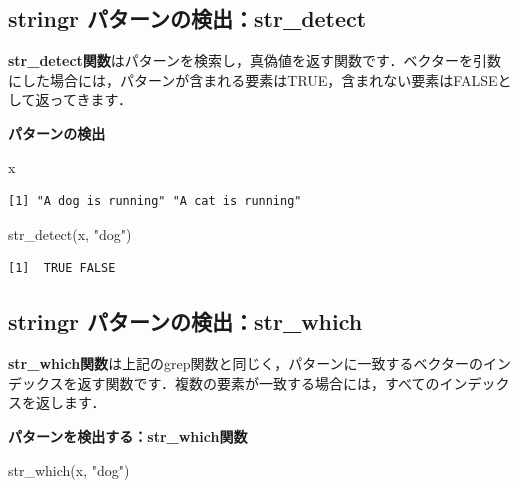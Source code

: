\documentclass[
  letterpaper,
  DIV=11,
  numbers=noendperiod]{scrreprt}
\newenvironment{Shaded}{\begin{snugshade}}{\end{snugshade}}
\newcommand{\FunctionTok}[1]{\textcolor[rgb]{0.28,0.35,0.67}{#1}}
\newcommand{\NormalTok}[1]{\textcolor[rgb]{0.00,0.23,0.31}{#1}}
\newcommand{\StringTok}[1]{\textcolor[rgb]{0.13,0.47,0.30}{#1}}
\begin{document}
\hypertarget{stringr-ux30d1ux30bfux30fcux30f3ux306eux691cux51fastr_detect}{%
\subsection{stringr
パターンの検出：str\_detect}\label{stringr-ux30d1ux30bfux30fcux30f3ux306eux691cux51fastr_detect}}

\textbf{str\_detect関数}はパターンを検索し，真偽値を返す関数です．ベクターを引数にした場合には，パターンが含まれる要素はTRUE，含まれない要素はFALSEとして返ってきます．

\textbf{パターンの検出}

\begin{Shaded}
\begin{Highlighting}[]
\NormalTok{x}
\end{Highlighting}
\end{Shaded}

\begin{verbatim}
[1] "A dog is running" "A cat is running"
\end{verbatim}

\begin{Shaded}
\begin{Highlighting}[]
\FunctionTok{str\_detect}\NormalTok{(x, }\StringTok{"dog"}\NormalTok{)}
\end{Highlighting}
\end{Shaded}

\begin{verbatim}
[1]  TRUE FALSE
\end{verbatim}

\hypertarget{stringr-ux30d1ux30bfux30fcux30f3ux306eux691cux51fastr_which}{%
\subsection{stringr
パターンの検出：str\_which}\label{stringr-ux30d1ux30bfux30fcux30f3ux306eux691cux51fastr_which}}

\textbf{str\_which関数}は上記のgrep関数と同じく，パターンに一致するベクターのインデックスを返す関数です．複数の要素が一致する場合には，すべてのインデックスを返します．

\textbf{パターンを検出する：str\_which関数}

\begin{Shaded}
\begin{Highlighting}[]
\FunctionTok{str\_which}\NormalTok{(x, }\StringTok{"dog"}\NormalTok{)}
\end{Highlighting}
\end{Shaded}
\end{document}
